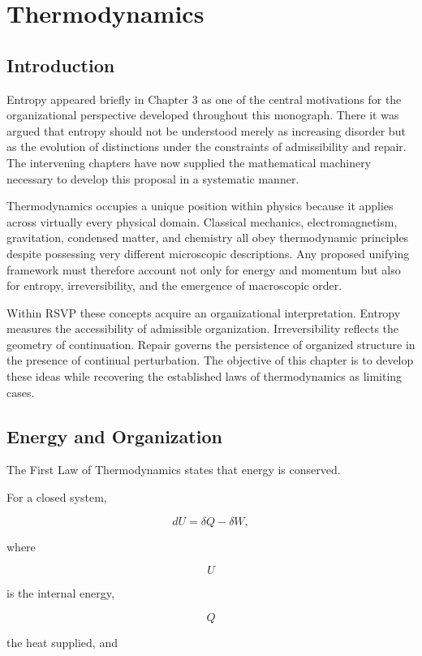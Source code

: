 \documentclass[11pt,oneside]{book}
\numberwithin{equation}{chapter}
\theoremstyle{definition}
\theoremstyle{plain}
\begin{document}
\chapter{Thermodynamics}

\section{Introduction}

Entropy appeared briefly in Chapter 3 as one of the central motivations for
the organizational perspective developed throughout this monograph. There
it was argued that entropy should not be understood merely as increasing
disorder but as the evolution of distinctions under the constraints of
admissibility and repair. The intervening chapters have now supplied the
mathematical machinery necessary to develop this proposal in a systematic
manner.

Thermodynamics occupies a unique position within physics because it applies
across virtually every physical domain. Classical mechanics,
electromagnetism, gravitation, condensed matter, and chemistry all obey
thermodynamic principles despite possessing very different microscopic
descriptions. Any proposed unifying framework must therefore account not
only for energy and momentum but also for entropy, irreversibility, and the
emergence of macroscopic order.

Within RSVP these concepts acquire an organizational interpretation. Entropy
measures the accessibility of admissible organization. Irreversibility
reflects the geometry of continuation. Repair governs the persistence of
organized structure in the presence of continual perturbation. The
objective of this chapter is to develop these ideas while recovering the
established laws of thermodynamics as limiting cases.

\section{Energy and Organization}

The First Law of Thermodynamics states that energy is conserved.

For a closed system,

\[
dU
=
\delta Q
-
\delta W,
\]

where

\[
U
\]

is the internal energy,

\[
Q
\]

the heat supplied, and
\end{document}
